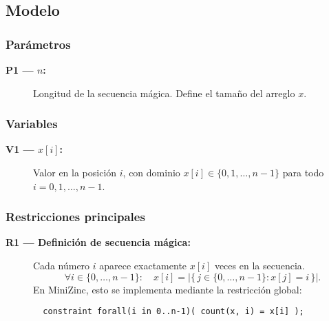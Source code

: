 

\subsection{Modelo}\label{sec:01-secuencias-magicas-modelo}

\subsubsection*{Parámetros}
\begin{description}
  \item[\textbf{P1 — \(n\):}] Longitud de la secuencia mágica. Define el tamaño del arreglo \(x\).
\end{description}

\subsubsection*{Variables}
\begin{description}
  \item[\textbf{V1 — \(x[i]\):}] Valor en la posición \(i\), con dominio \(x[i] \in \{0, 1, \dots, n-1\}\) para todo \(i = 0, 1, \dots, n-1\).
\end{description}

\subsubsection*{Restricciones principales}
\begin{description}
  \item[\textbf{R1 — Definición de secuencia mágica:}] Cada número \(i\) aparece exactamente \(x[i]\) veces en la secuencia. 
  \[
  \forall i \in \{0, \dots, n-1\}:\quad x[i] = \bigl|\{\, j \in \{0, \dots, n-1\} : x[j] = i \,\}\bigr|.
  \]
  En MiniZinc, esto se implementa mediante la restricción global:
  \begin{verbatim}
  constraint forall(i in 0..n-1)( count(x, i) = x[i] );
  \end{verbatim}
\end{description}

